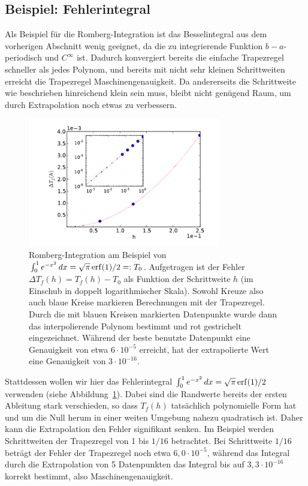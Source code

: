 \subsection{Beispiel: Fehlerintegral}

Als Beispiel für die Romberg-Integration ist das Besselintegral aus
dem vorherigen Abschnitt wenig geeignet, da die zu integrierende
Funktion $b-a$-periodisch und $C^\infty$ ist. Dadurch konvergiert
bereits die einfache Trapezregel schneller als jedes Polynom, und
bereits mit nicht sehr kleinen Schrittweiten erreicht die Trapezregel
Maschinengenauigkeit. Da andererseits die Schrittweite wie beschrieben
hinreichend klein sein muss, bleibt nicht genügend Raum, um durch
Extrapolation noch etwas zu verbessern. 

\begin{figure}
  \centering
  \includegraphics[width=0.75\textwidth]{plots/romberg}
  \caption{Romberg-Integration am Beispiel von $\int_0^1 e^{-x^2}\,dx
    = \sqrt{\pi}\operatorname{erf}(1)/2 =: T_0$. Aufgetragen ist der Fehler $\Delta
    T_f(h) = T_f(h) - T_0$ als Funktion der Schrittweite $h$ (im Einschub
    in doppelt logarithmischer Skala). Sowohl Kreuze also auch blaue
    Kreise markieren Berechnungen mit der Trapezregel. Durch die mit
    blauen Kreisen markierten Datenpunkte wurde dann das
    interpolierende Polynom bestimmt und rot gestrichelt
    eingezeichnet. Während der beste benutzte Datenpunkt eine
    Genauigkeit von etwa $6\cdot10^{-5}$ erreicht, hat der
    extrapolierte Wert eine Genauigkeit von $3\cdot 10^{-16}$.  }
  \label{fig:romberg}
\end{figure}

Stattdessen wollen wir hier das Fehlerintegral $\int_0^1 e^{-x^2}\,dx
= \sqrt{\pi}\operatorname{erf}(1)/2$ verwenden (siehe Abbildung~\ref{fig:romberg}).
Dabei sind die Randwerte bereits der ersten Ableitung stark
verschieden, so dass $T_f(h)$ tatsächlich polynomielle Form hat und um
die Null herum in einer weiten Umgebung nahezu quadratisch ist. Daher
kann die Extrapolation den Fehler signifikant senken.  Im Beispiel
werden Schrittweiten der Trapezregel von 1 bis $1/16$ betrachtet. Bei
Schrittweite $1/16$ beträgt der Fehler der Trapezregel noch etwa
$6,0\cdot 10^{-5}$, während das Integral durch die Extrapolation von 5
Datenpunkten das Integral bis auf $3,3\cdot 10^{-16}$ korrekt
bestimmt, also Maschinengenauigkeit.

